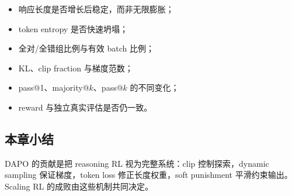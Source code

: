 \begin{itemize}
    \item 响应长度是否增长后稳定，而非无限膨胀；
    \item token entropy 是否快速坍塌；
    \item 全对/全错组比例与有效 batch 比例；
    \item KL、clip fraction 与梯度范数；
    \item pass@1、majority@$k$、pass@$k$ 的不同变化；
    \item reward 与独立真实评估是否仍一致。
\end{itemize}

\subsection{本章小结}

DAPO 的贡献是把 reasoning RL 视为完整系统：clip 控制探索，dynamic sampling 保证梯度，token loss 修正长度权重，soft punishment 平滑约束输出。Scaling RL 的成败由这些机制共同决定。

